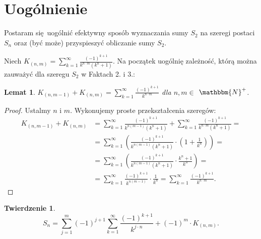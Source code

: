 \documentclass{article}
\newtheorem{lemat}{Lemat}
\newtheorem{tw}{Twierdzenie}
\begin{document}
\section{Uogólnienie}
Postaram się uogólnić efektywny sposób wyznaczania sumy $S_2$
na szeregi postaci $S_n$ oraz (być może) przyspieszyć obliczanie sumy $S_2$.

Niech $\displaystyle{K_{(n,m)}} = \sum_{k=1}^{\infty}\frac{(-1)^{k+1}}{k^{n\cdot m}(k^n+1)}$.
Na początek uogólnię zależność, którą można zauważyć dla szeregu $S_2$ w Faktach 2. i 3.:
\begin{lemat}
$K_{(n,m-1)} + K_{(n,m)} = \displaystyle\sum_{k=1}^{\infty}\frac{(-1)^{k+1}}{k^{n\cdot m}}$ dla $n,m \in$ $\mathbbm{N}^{+}$.
\end{lemat}

\begin{proof}
Ustalmy $n$ i $m$.
Wykonujemy proste przekształcenia szeregów:
\begin{align*}
  K_{(n,m-1)} + K_{(n,m)} &=
  \displaystyle\sum_{k=1}^{\infty}\frac{(-1)^{k+1}}{k^{n(m-1)}(k^n+1)} + \displaystyle\sum_{k=1}^{\infty}\frac{(-1)^{k+1}}{k^{n \cdot m}(k^n+1)} =\\
   &= \displaystyle\sum_{k=1}^{\infty}\left(\frac{(-1)^{k+1}}{k^{n(m-1)}(k^n+1)}\cdot\left(1 + \frac{1}{k^n}\right)\right) = \\ &= 
    \displaystyle\sum_{k=1}^{\infty}\left(\frac{(-1)^{k+1}}{k^{n(m-1)}(k^n+1)}\cdot\frac{k^{n}+1}{k^n}\right) =
    \\ &= \displaystyle\sum_{k=1}^{\infty}\frac{(-1)^{k+1}}{k^{n(m-1)}}\cdot \frac{1}{k^{n}} =
   \displaystyle\sum_{k=1}^{\infty}\frac{(-1)^{k+1}}{k^{n\cdot m}}.
\end{align*}
\end{proof}

\clearpage

\begin{tw}
\begin{equation}
S_{n} = \displaystyle\sum_{j=1}^{m}\left(-1\right)^{j+1}\displaystyle\sum_{k=1}^{\infty}\frac{(-1)^{k+1}}{k^{j\cdot n}} + (-1)^{m} \cdot K_{(n,m)}.
\end{equation}
\end{tw}
\end{document}
